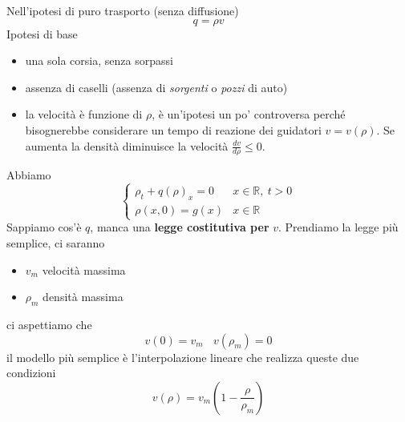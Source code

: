 \documentclass[10pt,a4paper,twoside,openright]{book}
\begin{document}
Nell'ipotesi di puro trasporto (senza diffusione)
\begin{equation}
	q=\rho v
\end{equation}
Ipotesi di base
\begin{itemize}
	\item una sola corsia, senza sorpassi
	\item assenza di caselli (assenza di \textit{sorgenti} o \textit{pozzi} di auto)
	\item la velocità è funzione di $\rho $, è un'ipotesi un po' controversa perché bisognerebbe considerare un tempo di reazione dei guidatori $v=v( \rho )$. Se aumenta la densità diminuisce la velocità $\frac{dv}{d\rho } \leqslant 0$.
\end{itemize}

Abbiamo
\begin{equation}
	\begin{cases}
		\rho _{t} +q( \rho )_{x} =0 & x\in \mathbb{R} ,\ t >0 \\
		\rho ( x,0) =g( x)          & x\in \mathbb{R}         
	\end{cases}
\end{equation}
Sappiamo cos'è $q$, manca una \textbf{legge costitutiva per }$v$. Prendiamo la legge più semplice, ci saranno
\begin{itemize}
	\item $v_{m}$ velocità massima
	\item $\rho _{m}$ densità massima
\end{itemize}

ci aspettiamo che
\begin{equation*}
	v( 0) =v_{m} \ \ \ \ v( \rho _{m}) =0
\end{equation*}
il modello più semplice è l'interpolazione lineare che realizza queste due condizioni
\begin{equation}
	v( \rho ) =v_{m}\left( 1-\frac{\rho }{\rho _{m}}\right)
\end{equation}
	
\end{document}
